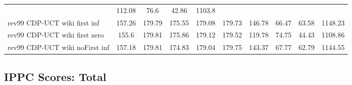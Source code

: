 \documentclass{article}
\begin{document}
\begin{tabular}{|l|r@{$\pm$}rr@{$\pm$}rr@{$\pm$}rr@{$\pm$}rr@{$\pm$}rr@{$\pm$}rr@{$\pm$}rr@{$\pm$}rr@{$\pm$}r|}
& \multicolumn{2}{c}{112.08}
& \multicolumn{2}{c}{76.6}
& \multicolumn{2}{c}{42.86}
& \multicolumn{2}{c|}{1103.8}
\\
rev99 CDP-UCT wiki first inf
& \multicolumn{2}{c}{157.26}
& \multicolumn{2}{c}{179.79}
& \multicolumn{2}{c}{175.55}
& \multicolumn{2}{c}{179.08}
& \multicolumn{2}{c}{179.73}
& \multicolumn{2}{c}{146.78}
& \multicolumn{2}{c}{66.47}
& \multicolumn{2}{c}{63.58}
& \multicolumn{2}{c|}{1148.23}
\\
rev99 CDP-UCT wiki first zero
& \multicolumn{2}{c}{155.6}
& \multicolumn{2}{c}{179.81}
& \multicolumn{2}{c}{175.86}
& \multicolumn{2}{c}{179.12}
& \multicolumn{2}{c}{179.52}
& \multicolumn{2}{c}{119.78}
& \multicolumn{2}{c}{74.75}
& \multicolumn{2}{c}{44.43}
& \multicolumn{2}{c|}{1108.86}
\\
rev99 CDP-UCT wiki noFirst inf
& \multicolumn{2}{c}{157.18}
& \multicolumn{2}{c}{179.81}
& \multicolumn{2}{c}{174.83}
& \multicolumn{2}{c}{179.04}
& \multicolumn{2}{c}{179.75}
& \multicolumn{2}{c}{143.37}
& \multicolumn{2}{c}{67.77}
& \multicolumn{2}{c}{62.79}
& \multicolumn{2}{c|}{1144.55}
\\
\hline
\end{tabular}%

\bigskip

\subsection*{IPPC Scores: Total}
\end{document}
